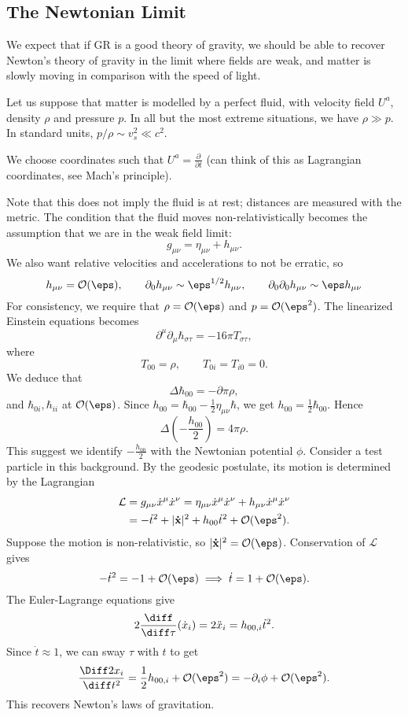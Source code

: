 \documentclass[12pt]{article}
\begin{document}
\subsection{The Newtonian Limit}%
\label{sub:tnl}

We expect that if GR is a good theory of gravity, we should be able to recover Newton's theory of gravity in the limit where fields are weak, and matter is slowly moving in comparison with the speed of light.

Let us suppose that matter is modelled by a perfect fluid, with velocity field $U^a$, density $\rho$ and pressure $p$. In all but the most extreme situations, we have $\rho \gg p$. In standard units, $p/\rho \sim v_s^2 \ll c^2$.

We choose coordinates such that $U^a = \frac{\partial}{\partial t}$ (can think of this as Lagrangian coordinates, see Mach's principle).

Note that this does not imply the fluid is at rest; distances are measured with the metric. The condition that the fluid moves non-relativistically becomes the assumption that we are in the weak field limit:
\[
g_{\mu\nu} = \eta_{\mu\nu} + h_{\mu\nu}.
\]
We also want relative velocities and accelerations to not be erratic, so
\[
h_{\mu\nu} = \mathcal{O}(\eps), \qquad \partial_0 h_{\mu\nu} \sim \eps^{1/2} h_{\mu\nu}, \qquad \partial_0\partial_0 h_{\mu\nu} \sim \eps h_{\mu\nu}
\]
For consistency, we require that $\rho = \mathcal{O}(\eps)$ and $p = \mathcal{O}(\eps^2)$. The linearized Einstein equations becomes
\[
	\partial^\mu \partial_\mu \hbar_{\sigma\tau} = - 16 \pi T_{\sigma\tau},
\]
where
\[
T_{00} = \rho, \qquad T_{0i} = T_{i0} = 0.
\]
We deduce that
\[
\Delta \hbar_{00} = - \partial \pi \rho,
\]
and $\hbar_{0i}, \hbar_{ii}$ at $\mathcal{O}(\eps)$. Since $h_{00} = \hbar_{00} - \frac{1}{2} \eta_{\mu\nu} \hbar$, we get $h_{00} = \frac{1}{2} \hbar_{00}$. Hence
\[
\Delta \left( - \frac{h_{00}}{2} \right) = 4 \pi \rho.
\]
This suggest we identify $- \frac{h_{00}}{2}$ with the Newtonian potential $\phi$. Consider a test particle in this background. By the geodesic postulate, its motion is determined by the Lagrangian
\begin{align*}
	\mathcal{L} &= g_{\mu\nu} \dot x^\mu \dot x^\nu = \eta_{\mu\nu} \dot x^\mu \dot x^\nu + h_{\mu\nu} \dot x^\mu \dot x^\nu \\
		    &= - \dot t^2 + |\mathbf{\dot x}|^2 + h_{00} \dot t^2 + \mathcal{O}(\eps^2).
\end{align*}
Suppose the motion is non-relativistic, so $|\mathbf{\dot x}|^2 = \mathcal{O}(\eps)$. Conservation of $\mathcal{L}$ gives
\[
-\dot t^2 = -1 + \mathcal{O}(\eps) \implies \dot t = 1 + \mathcal{O}(\eps).
\]
The Euler-Lagrange equations give
\[
2\frac{\diff}{\diff \tau} (\dot x_i) = 2 \ddot x_i = h_{00,i} \dot t^2.
\]
Since $\dot t \approx 1$, we can sway $\tau$ with $t$ to get
\[
\frac{\Diff 2 x_i}{\diff t^2} = \frac{1}{2} h_{00, i} + \mathcal{O}(\eps^2) = - \partial_i \phi + \mathcal{O}(\eps^2).
\]
This recovers Newton's laws of gravitation.
\end{document}
